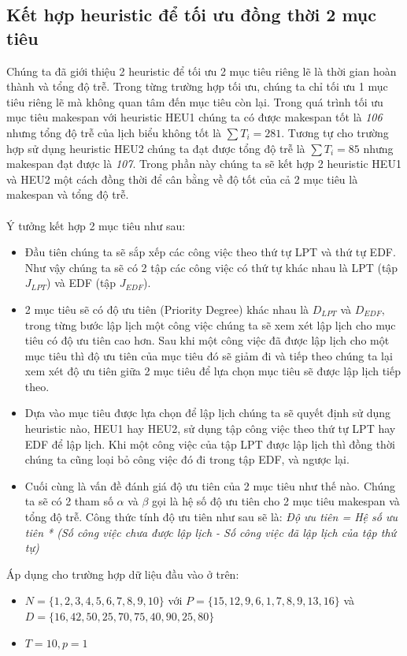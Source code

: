 \documentclass[a4paper,12pt]{article}
\begin{document}
\subsection{Kết hợp heuristic để tối ưu đồng thời 2 mục tiêu}
Chúng ta đã giới thiệu 2 heuristic để tối ưu 2 mục tiêu riêng lẽ là thời gian hoàn thành và tổng độ trễ. Trong từng trường hợp tối ưu, chúng ta chỉ tối ưu 1 mục tiêu riêng lẽ mà không quan tâm đến mục tiêu còn lại. Trong quá trình tối ưu mục tiêu makespan với heuristic HEU1 chúng ta có được makespan tốt là \textit{106} nhưng tổng độ trễ của lịch biểu không tốt là $\sum T_i = 281$. Tương tự cho trường hợp sử dụng heuristic HEU2 chúng ta đạt được tổng độ trễ là $\sum T_i = 85$ nhưng makespan đạt được là \textit{107}. Trong phần này chúng ta sẽ kết hợp 2 heuristic HEU1 và HEU2 một cách đồng thời để cân bằng về độ tốt của cả 2 mục tiêu là makespan và tổng độ trễ.\\\\
Ý tưởng kết hợp 2 mục tiêu như sau:
\begin{itemize}
\item
Đầu tiên chúng ta sẽ sắp xếp các công việc theo thứ tự LPT và thứ tự EDF. Như vậy chúng ta sẽ có 2 tập các công việc có thứ tự khác nhau là LPT (tập $J_{LPT}$) và EDF (tập $J_{EDF}$).
\item
2 mục tiêu sẽ có độ ưu tiên (Priority Degree) khác nhau là $D_{LPT}$ và $D_{EDF}$, trong từng bước lập lịch một công việc chúng ta sẽ xem xét lập lịch cho mục tiêu có độ ưu tiên cao hơn. Sau khi một công việc đã được lập lịch cho một mục tiêu thì độ ưu tiên của mục tiêu đó sẽ giảm đi và tiếp theo chúng ta lại xem xét độ ưu tiên giữa 2 mục tiêu để lựa chọn mục tiêu sẽ được lập lịch tiếp theo.
\item
Dựa vào mục tiêu được lựa chọn để lập lịch chúng ta sẽ quyết định sử dụng heuristic nào, HEU1 hay HEU2, sử dụng tập công việc theo thứ tự LPT hay EDF để lập lịch. Khi một công việc của tập LPT được lập lịch thì đồng thời chúng ta cũng loại bỏ công việc đó đi trong tập EDF, và ngược lại.
\item
Cuối cùng là vấn đề đánh giá độ ưu tiên của 2 mục tiêu như thế nào. Chúng ta sẽ có 2 tham số $\alpha$ và $\beta$ gọi là hệ số độ ưu tiên cho 2 mục tiêu makespan và tổng độ trễ. Công thức tính độ ưu tiên như sau sẽ là:\textit{ Độ ưu tiên = Hệ số ưu tiên * (Số công việc chưa được lập lịch - Số công việc đã lập lịch của tập thứ tự)}
\end{itemize}
Áp dụng cho trường hợp dữ liệu đầu vào ở trên:
\begin{itemize}
\item
$N = \{1, 2, 3, 4, 5, 6, 7, 8, 9, 10\}$ với $P = \{15, 12, 9, 6, 1, 7, 8, 9, 13, 16\}$ và\\ $D = \{16, 42, 50, 25, 70, 75, 40, 90, 25, 80\}$
\item
$T = 10, p = 1$
\end{itemize}
\end{document}

